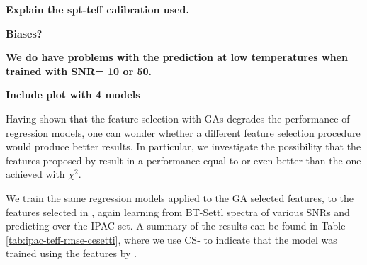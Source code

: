 
{\bf Explain the spt-teff calibration used.}

{\bf Biases?}

{\bf We do have problems with the prediction at low temperatures when
trained with SNR= 10 or 50.}

{\bf Include plot with 4 models}



Having shown that the feature selection with GAs degrades the
performance of regression models, one can wonder whether a different
feature selection procedure would produce better results. In
particular, we investigate the possibility that the features proposed
by \cite{cesetti} result in a performance equal to or even better than
the one achieved with $\chi^2$.


We train the same regression models applied to the GA selected
features, to the features selected in \cite{cesetti}, again learning
from BT-Settl spectra of various SNRs and predicting over the IPAC
set. A summary of the results can be found in Table
\ref{tab:ipac-teff-rmse-cesetti}, where we use CS- to indicate that the model was
trained using the features by \cite{cesetti}.

